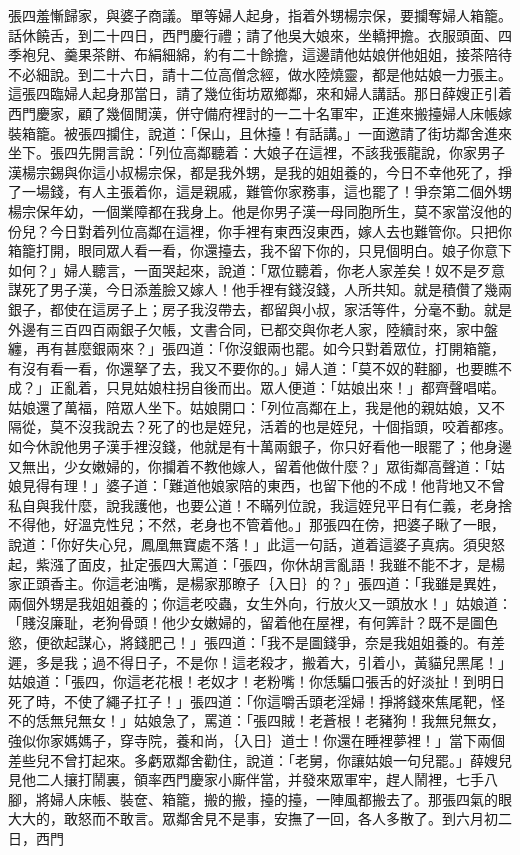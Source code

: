 \begin{showcontents}{}
張四羞慚歸家，與婆子商議。單等婦人起身，指着外甥楊宗保，要攔奪婦人箱籠。話休饒舌，到二十四日，西門慶行禮；請了他吳大娘來，坐轎押擔。衣服頭面、四季袍兒、羹果茶餅、布絹細綿，約有二十餘擔，這邊請他姑娘併他姐姐，接茶陪待不必細說。到二十六日，請十二位高僧念經，做水陸燒靈，都是他姑娘一力張主。這張四臨婦人起身那當日，請了幾位街坊眾鄉鄰，來和婦人講話。那日薛嫂正引着西門慶家，顧了幾個閒漢，併守備府裡討的一二十名軍牢，正進來搬擡婦人床帳嫁裝箱籠。被張四攔住，說道：「保山，且休擡！有話講。」一面邀請了街坊鄰舍進來坐下。張四先開言說：「列位高鄰聽着：大娘子在這裡，不該我張龍說，你家男子漢楊宗錫與你這小叔楊宗保，都是我外甥，是我的姐姐養的，今日不幸他死了，掙了一場錢，有人主張着你，這是親戚，難管你家務事，這也罷了！爭奈第二個外甥楊宗保年幼，一個業障都在我身上。他是你男子漢一母同胞所生，莫不家當沒他的份兒？今日對着列位高鄰在這裡，你手裡有東西沒東西，嫁人去也難管你。只把你箱籠打開，眼同眾人看一看，你還擡去，我不留下你的，只見個明白。娘子你意下如何？」婦人聽言，一面哭起來，說道：「眾位聽着，你老人家差矣！奴不是歹意謀死了男子漢，今日添羞臉又嫁人！他手裡有錢沒錢，人所共知。就是積儹了幾兩銀子，都使在這房子上；房子我沒帶去，都留與小叔，家活等件，分毫不動。就是外邊有三百四百兩銀子欠帳，文書合同，已都交與你老人家，陸續討來，家中盤纏，再有甚麼銀兩來？」張四道：「你沒銀兩也罷。如今只對着眾位，打開箱籠，有沒有看一看，你還拏了去，我又不要你的。」婦人道：「莫不奴的鞋腳，也要瞧不成？」正亂着，只見姑娘柱拐自後而出。眾人便道：「姑娘出來！」都齊聲唱喏。姑娘還了萬福，陪眾人坐下。姑娘開口：「列位高鄰在上，我是他的親姑娘，又不隔從，莫不沒我說去？死了的也是姪兒，活着的也是姪兒，十個指頭，咬着都疼。如今休說他男子漢手裡沒錢，他就是有十萬兩銀子，你只好看他一眼罷了；他身邊又無出，少女嫩婦的，你攔着不教他嫁人，留着他做什麼？」眾街鄰高聲道：「姑娘見得有理！」婆子道：「難道他娘家陪的東西，也留下他的不成！他背地又不曾私自與我什麼，說我護他，也要公道！不瞞列位說，我這姪兒平日有仁義，老身捨不得他，好溫克性兒；不然，老身也不管着他。」那張四在傍，把婆子瞅了一眼，說道：「你好失心兒，鳳凰無寶處不落！」此這一句話，道着這婆子真病。須臾怒起，紫漒了面皮，扯定張四大罵道：「張四，你休胡言亂語！我雖不能不才，是楊家正頭香主。你這老油嘴，是楊家那瞭子｛入日｝的？」張四道：「我雖是異姓，兩個外甥是我姐姐養的；你這老咬蟲，女生外向，行放火又一頭放水！」姑娘道：「賤沒廉耻，老狗骨頭！他少女嫩婦的，留着他在屋裡，有何筭計？既不是圖色慾，便欲起謀心，將錢肥己！」張四道：「我不是圖錢爭，奈是我姐姐養的。有差遲，多是我；過不得日子，不是你！這老殺才，搬着大，引着小，黃貓兒黑尾！」姑娘道：「張四，你這老花根！老奴才！老粉嘴！你恁騙口張舌的好淡扯！到明日死了時，不使了繩子扛子！」張四道：「你這嚼舌頭老淫婦！掙將錢來焦尾靶，怪不的恁無兒無女！」姑娘急了，罵道：「張四賊！老蒼根！老豬狗！我無兒無女，強似你家媽媽子，穿寺院，養和尚，｛入日｝道士！你還在睡裡夢裡！」當下兩個差些兒不曾打起來。多虧眾鄰舍勸住，說道：「老舅，你讓姑娘一句兒罷。」薛嫂兒見他二人攘打鬧裏，領率西門慶家小廝伴當，并發來眾軍牢，趕人鬧裡，七手八腳，將婦人床帳、裝奩、箱籠，搬的搬，擡的擡，一陣風都搬去了。那張四氣的眼大大的，敢怒而不敢言。眾鄰舍見不是事，安撫了一回，各人多散了。到六月初二日，西門
\end{showcontents}
